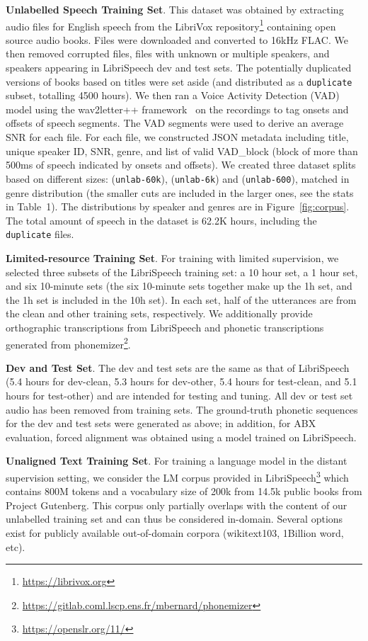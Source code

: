 \documentclass{article}
\begin{document}
\textbf{Unlabelled Speech Training Set}. This dataset was obtained by extracting audio files for English speech from the LibriVox repository\footnote{\url{https://librivox.org}} containing open source audio books.  Files were downloaded and converted to 16kHz FLAC. We then removed corrupted files, files with unknown or multiple speakers, and speakers appearing in LibriSpeech dev and test sets. The potentially duplicated versions of books based on titles were set aside (and distributed as a \texttt{duplicate} subset, totalling 4500 hours). We then ran a Voice Activity Detection (VAD) model using the wav2letter++ framework~\cite{wav2letter++} on the recordings to tag onsets and offsets of speech segments. The VAD segments were used to derive an average SNR for each file. For each file, we constructed JSON metadata including title, unique speaker ID, SNR, genre, and list of valid VAD\_block (block of more than 500ms of speech indicated by onsets and offsets). We created three dataset splits based on different sizes: (\texttt{unlab-60k}), (\texttt{unlab-6k}) and (\texttt{unlab-600}), matched in genre distribution (the smaller cuts are included in the larger ones, see the stats in Table~1).
The distributions by speaker and genres are in Figure~\ref{fig:corpus}. The total amount of speech in the dataset is 62.2K hours, including the \texttt{duplicate} files.
 
\textbf{Limited-resource Training Set}. For training with limited supervision, we selected three subsets of the LibriSpeech training set: a 10 hour set, a 1 hour set, and six 10-minute sets (the six 10-minute sets together make up the 1h set, and the 1h set is included in the 10h set). In each set, half of the utterances are from the clean and other training sets, respectively. We additionally provide orthographic transcriptions from LibriSpeech and phonetic transcriptions generated from phonemizer\footnote{\url{https://gitlab.coml.lscp.ens.fr/mbernard/phonemizer}}. 

\textbf{Dev and Test Set}. The dev and test sets are the same as that of LibriSpeech (5.4 hours for dev-clean, 5.3 hours for dev-other, 5.4 hours for test-clean, and 5.1 hours for test-other) and are intended for testing and tuning. All dev or test set audio has been removed from training sets. The ground-truth phonetic sequences for the dev and test sets were generated as above; in addition, for ABX evaluation, forced alignment was obtained using a model trained on LibriSpeech.


\textbf{Unaligned Text Training Set}. For training a language model in the distant supervision setting, we consider the LM corpus provided in LibriSpeech\footnote{\url{https://openslr.org/11/}} which contains 800M tokens and a vocabulary size of 200k from 14.5k public books from Project Gutenberg. This corpus only partially overlaps with the content of our unlabelled training set and can thus be considered in-domain. Several options exist for publicly available out-of-domain corpora (wikitext103, 1Billion word, etc). 
\end{document}
